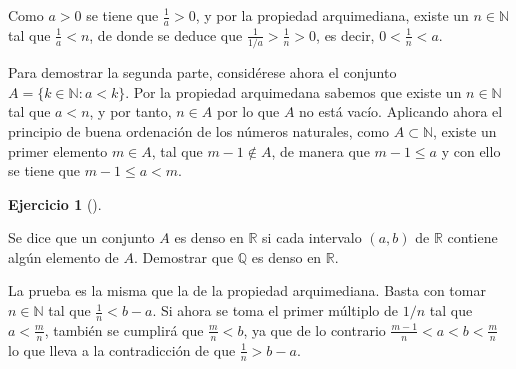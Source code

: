 \documentclass[
  a4paper,
]{scrreport}
\theoremstyle{definition}
\newtheorem{exercise}{Ejercicio}[chapter]
\theoremstyle{remark}
\begin{document}
\begin{tcolorbox}[enhanced jigsaw, left=2mm, coltitle=black, colbacktitle=quarto-callout-tip-color!10!white, opacitybacktitle=0.6, colback=white, breakable, titlerule=0mm, toptitle=1mm, rightrule=.15mm, bottomtitle=1mm, bottomrule=.15mm, toprule=.15mm, leftrule=.75mm, arc=.35mm, opacityback=0, title=\textcolor{quarto-callout-tip-color}{\faLightbulb}\hspace{0.5em}{Solución}, colframe=quarto-callout-tip-color-frame]

Como \(a>0\) se tiene que \(\frac{1}{a}>0\), y por la propiedad
arquimediana, existe un \(n\in\mathbb{N}\) tal que \(\frac{1}{a}<n\), de
donde se deduce que \(\frac{1}{1/a}>\frac{1}{n}>0\), es decir,
\(0<\frac{1}{n}<a\).

Para demostrar la segunda parte, considérese ahora el conjunto
\(A=\{k\in \mathbb{N}: a<k\}\). Por la propiedad arquimedana sabemos que
existe un \(n\in \mathbb{N}\) tal que \(a<n\), y por tanto, \(n\in A\)
por lo que \(A\) no está vacío. Aplicando ahora el principio de buena
ordenación de los números naturales, como \(A\subset \mathbb{N}\),
existe un primer elemento \(m\in A\), tal que \(m-1\not\in A\), de
manera que \(m-1\leq a\) y con ello se tiene que \(m-1\leq a<m\).

\end{tcolorbox}

\begin{exercise}[]\protect\hypertarget{exr-densidad-racionales}{}\label{exr-densidad-racionales}

Se dice que un conjunto \(A\) es denso en \(\mathbb{R}\) si cada
intervalo \((a,b)\) de \(\mathbb{R}\) contiene algún elemento de \(A\).
Demostrar que \(\mathbb{Q}\) es denso en \(\mathbb{R}\).

\end{exercise}

\begin{tcolorbox}[enhanced jigsaw, left=2mm, coltitle=black, colbacktitle=quarto-callout-tip-color!10!white, opacitybacktitle=0.6, colback=white, breakable, titlerule=0mm, toptitle=1mm, rightrule=.15mm, bottomtitle=1mm, bottomrule=.15mm, toprule=.15mm, leftrule=.75mm, arc=.35mm, opacityback=0, title=\textcolor{quarto-callout-tip-color}{\faLightbulb}\hspace{0.5em}{Solución}, colframe=quarto-callout-tip-color-frame]

La prueba es la misma que la de la propiedad arquimediana. Basta con
tomar \(n\in \mathbb{N}\) tal que \(\frac{1}{n}< b-a\). Si ahora se toma
el primer múltiplo de \(1/n\) tal que \(a<\frac{m}{n}\), también se
cumplirá que \(\frac{m}{n}<b\), ya que de lo contrario
\(\frac{m-1}{n}<a<b<\frac{m}{n}\) lo que lleva a la contradicción de que
\(\frac{1}{n}>b-a\).

\end{tcolorbox}
\end{document}
